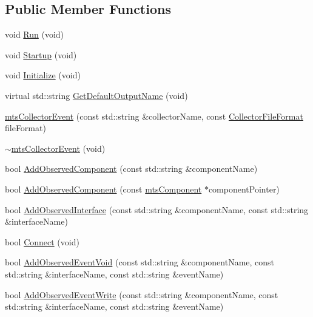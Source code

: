 \subsection*{Public Member Functions}
\begin{DoxyCompactItemize}
\item 
void \hyperlink{classmts_collector_event_a9812847f92aa6d306fefcd900bdb7d8d}{Run} (void)
\item 
void \hyperlink{classmts_collector_event_ab4ce892507f617fe27d1a38201c9e7b6}{Startup} (void)
\item 
void \hyperlink{classmts_collector_event_a92c173290a1a62c5b23b6ffad9ab0169}{Initialize} (void)
\item 
virtual std\-::string \hyperlink{classmts_collector_event_ab6cd1d40c968a7232be60db5e0757ea0}{Get\-Default\-Output\-Name} (void)
\item 
\hyperlink{classmts_collector_event_ade794609539f32f0ab0b44fce130c711}{mts\-Collector\-Event} (const std\-::string \&collector\-Name, const \hyperlink{classmts_collector_base_aa228bed8144053d0bfa316f9ac9d0901}{Collector\-File\-Format} file\-Format)
\item 
\hyperlink{classmts_collector_event_a4e732f97fbe8a6fafc58b3738eb79d79}{$\sim$mts\-Collector\-Event} (void)
\item 
bool \hyperlink{classmts_collector_event_a1c571d23c1c5c3f5fb9d301ec3fd109f}{Add\-Observed\-Component} (const std\-::string \&component\-Name)
\item 
bool \hyperlink{classmts_collector_event_aacb913e2147f9182487eaab381622caa}{Add\-Observed\-Component} (const \hyperlink{classmts_component}{mts\-Component} $\ast$component\-Pointer)
\item 
bool \hyperlink{classmts_collector_event_a9868b47d3a91ce625a4a5e8a0a925d76}{Add\-Observed\-Interface} (const std\-::string \&component\-Name, const std\-::string \&interface\-Name)
\item 
bool \hyperlink{classmts_collector_event_a9e9b47581d6445e5f0c5a71f70afe8e7}{Connect} (void)
\end{DoxyCompactItemize}
{\bf }\par
\begin{DoxyCompactItemize}
\item 
bool \hyperlink{classmts_collector_event_a5f3acacf1512a76a96d6462a05c9a145}{Add\-Observed\-Event\-Void} (const std\-::string \&component\-Name, const std\-::string \&interface\-Name, const std\-::string \&event\-Name)
\item 
bool \hyperlink{classmts_collector_event_a8022da71b4359c86c53bc64d5d443caa}{Add\-Observed\-Event\-Write} (const std\-::string \&component\-Name, const std\-::string \&interface\-Name, const std\-::string \&event\-Name)
\end{DoxyCompactItemize}

